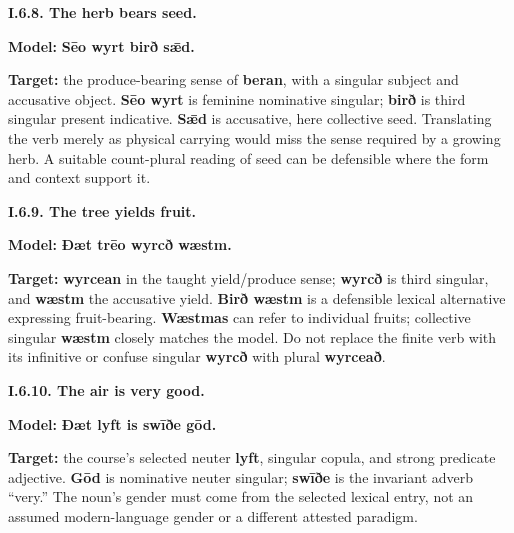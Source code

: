\par\begin{minipage}{\linewidth}\raggedright
\textbf{I.6.8. The herb bears seed.}

\textbf{Model:} \textbf{Sēo wyrt birð sǣd.}

\textbf{Target:} the produce-bearing sense of \textbf{beran}, with a singular subject and accusative object. \textbf{Sēo wyrt} is feminine nominative singular; \textbf{birð} is third singular present indicative. \textbf{Sǣd} is accusative, here collective seed. Translating the verb merely as physical carrying would miss the sense required by a growing herb. A suitable count-plural reading of seed can be defensible where the form and context support it.

\end{minipage}\par\addvspace{4pt}

\par\begin{minipage}{\linewidth}\raggedright
\textbf{I.6.9. The tree yields fruit.}

\textbf{Model:} \textbf{Ðæt trēo wyrcð wæstm.}

\textbf{Target:} \textbf{wyrcean} in the taught yield/\allowbreak{}produce sense; \textbf{wyrcð} is third singular, and \textbf{wæstm} the accusative yield. \textbf{Birð wæstm} is a defensible lexical alternative expressing fruit-bearing. \textbf{Wæstmas} can refer to individual fruits; collective singular \textbf{wæstm} closely matches the model. Do not replace the finite verb with its infinitive or confuse singular \textbf{wyrcð} with plural \textbf{wyrceað}.

\end{minipage}\par\addvspace{4pt}

\par\begin{minipage}{\linewidth}\raggedright
\textbf{I.6.10. The air is very good.}

\textbf{Model:} \textbf{Ðæt lyft is swīðe gōd.}

\textbf{Target:} the course’s selected neuter \textbf{lyft}, singular copula, and strong predicate adjective. \textbf{Gōd} is nominative neuter singular; \textbf{swīðe} is the invariant adverb “very.” The noun’s gender must come from the selected lexical entry, not an assumed modern-language gender or a different attested paradigm.

\end{minipage}\par\addvspace{4pt}

